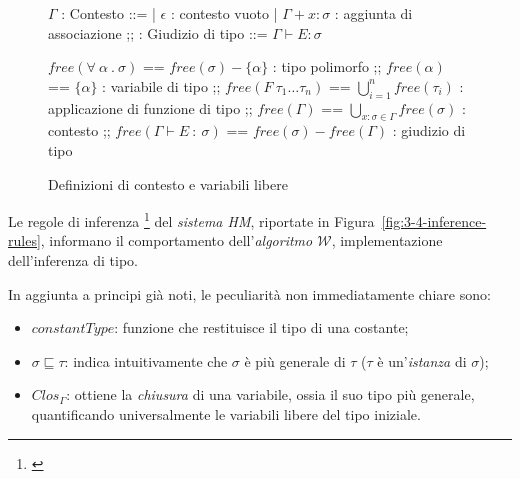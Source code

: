 \begin{figure}
    \vspace{4mm}
    \begin{bnf}
        $\Gamma$ : \small{Contesto} ::=
        | $\epsilon$ : \small{contesto vuoto}
        | $\Gamma + x \colon \sigma$ : \small{aggiunta di associazione}
        ;;
        : \small{Giudizio di tipo} ::= $\Gamma \vdash E \colon \sigma$
    \end{bnf}
    \par\vspace{12mm}
    \begin{bnf}
        $free(\forall\ \alpha\ .\ \sigma)$ == $free(\sigma) - \{\alpha\}$ : \small{tipo polimorfo}
        ;;
        $free(\alpha)$ == $\{\alpha\}$ : \small{variabile di tipo}
        ;;
        $free(F\ \tau_1\ldots\tau_n)$ == $\bigcup\limits_{i=1}^{n} free(\tau_i)$ : \small{applicazione di funzione di tipo}
        ;;
        $free(\Gamma)$ == $\bigcup\limits_{x\colon\sigma\in\Gamma} free(\sigma)$ : \small{contesto}
        ;;
        $free(\Gamma\vdash E\ \colon\ \sigma)$ == $free(\sigma) - free(\Gamma)$ : \small{giudizio di tipo}
    \end{bnf}
    \caption{Definizioni di contesto e variabili libere}
    \label{fig:3-4-context-free-variables}
    \vspace{4mm}
\end{figure}

\newpage

\noindent Le regole di inferenza%
\footnote{ \cite{Clement-1986-MiniML}}
del \textit{sistema HM}, riportate in Figura~\ref{fig:3-4-inference-rules},
informano il comportamento dell'\textit{algoritmo $\mathcal{W}$}, implementazione dell'inferenza di tipo.

\noindent In aggiunta a principi già noti, le peculiarità non immediatamente chiare sono:
\begin{itemize}
    \item $constantType$: funzione che restituisce il tipo di una costante;
    \item $\sigma \sqsubseteq \tau$: indica intuitivamente che $\sigma$ è più generale di $\tau$
          ($\tau$ è un'\textit{istanza} di $\sigma$);
    \item $Clos_\Gamma$: ottiene la \textit{chiusura} di una variabile, ossia il suo tipo più generale,
          quantificando universalmente le variabili libere del tipo iniziale.
\end{itemize}


